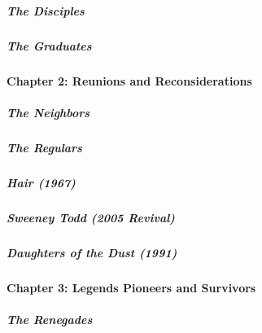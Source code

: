 \href{/interactive/2020/04/13/t-magazine/enrique-olvera-chef.html}{}

\hypertarget{the-disciples}{%
\subparagraph{The Disciples}\label{the-disciples}}

\href{/interactive/2020/04/13/t-magazine/royal-academy-antwerp.html}{}

\hypertarget{the-graduates}{%
\subparagraph{The Graduates}\label{the-graduates}}

\hypertarget{chapter-2-reunions-and-reconsiderations}{%
\paragraph{Chapter 2: Reunions and
Reconsiderations}\label{chapter-2-reunions-and-reconsiderations}}

\href{/interactive/2020/04/13/t-magazine/ninth-street-greenwich-village-neighbors.html}{}

\hypertarget{the-neighbors}{%
\subparagraph{The Neighbors}\label{the-neighbors}}

\href{/interactive/2020/04/13/t-magazine/omen-restaurant-nyc.html}{}

\hypertarget{the-regulars}{%
\subparagraph{The Regulars}\label{the-regulars}}

\href{/interactive/2020/04/13/t-magazine/hair-musical-broadway.html}{}

\hypertarget{hair-1967}{%
\subparagraph{Hair (1967)}\label{hair-1967}}

\href{/interactive/2020/04/13/t-magazine/sweeney-todd-revival.html}{}

\hypertarget{sweeney-todd-2005-revival}{%
\subparagraph{Sweeney Todd (2005
Revival)}\label{sweeney-todd-2005-revival}}

\href{/interactive/2020/04/13/t-magazine/daughters-of-the-dust.html}{}

\hypertarget{daughters-of-the-dust-1991}{%
\subparagraph{Daughters of the Dust
(1991)}\label{daughters-of-the-dust-1991}}

\hypertarget{chapter-3-legends-pioneers-and-survivors}{%
\paragraph{Chapter 3: Legends Pioneers and
Survivors}\label{chapter-3-legends-pioneers-and-survivors}}

\href{/interactive/2020/04/13/t-magazine/butch-stud-lesbian.html}{}

\hypertarget{the-renegades}{%
\subparagraph{The Renegades}\label{the-renegades}}


